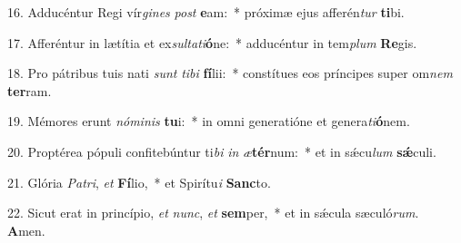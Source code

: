 16. Adducéntur Regi vír\textit{gi}\textit{nes} \textit{post} \textbf{e}am:~*  próximæ ejus afferén\textit{tur} \textbf{ti}bi.\

17. Afferéntur in lætítia et ex\textit{sul}\textit{ta}\textit{ti}\textbf{ó}ne:~*  adducéntur in tem\textit{plum} \textbf{Re}gis.\

18. Pro pátribus tuis nati \textit{sunt} \textit{ti}\textit{bi} \textbf{fí}lii:~*  constítues eos príncipes super om\textit{nem} \textbf{ter}ram.\

19. Mémores erunt \textit{nó}\textit{mi}\textit{nis} \textbf{tu}i:~*  in omni generatióne et genera\textit{ti}\textbf{ó}nem.\

20. Proptérea pópuli confitebúntur ti\textit{bi} \textit{in} \textit{æ}\textbf{tér}num:~*  et in sǽcu\textit{lum} \textbf{sǽ}culi.\

21. Glória \textit{Pa}\textit{tri}, \textit{et} \textbf{Fí}lio,~*  et Spirítu\textit{i} \textbf{Sanc}to.\

22. Sicut erat in princípio, \textit{et} \textit{nunc}, \textit{et} \textbf{sem}per,~*  et in sǽcula sæculó\textit{rum}. \textbf{A}men.\


